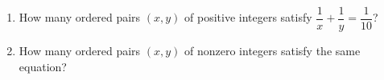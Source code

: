 \begin{enumerate}
\item[(a)] How many ordered pairs $(x,y)$ of positive integers satisfy $\dfrac{1}{x}+\dfrac{1}{y}=\dfrac{1}{10}$?
\item[(b)] How many ordered pairs $(x,y)$ of nonzero integers satisfy the same equation?
\end{enumerate}
